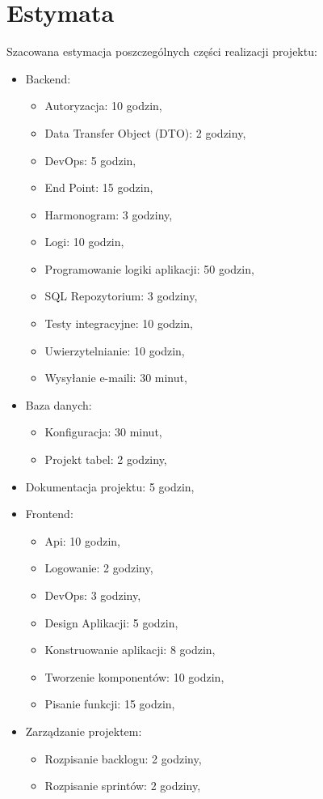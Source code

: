\documentclass[12pt,a4paper]{article}
\begin{document}
	\section{Estymata}
		\indent Szacowana estymacja poszczególnych części realizacji projektu:
		\begin{itemize}
			\item Backend:
				\begin{itemize}
					\item Autoryzacja: 10 godzin,
					\item Data Transfer Object (DTO): 2 godziny,
					\item DevOps: 5 godzin,
					\item End Point: 15 godzin,
					\item Harmonogram: 3 godziny,
					\item Logi: 10 godzin,
					\item Programowanie logiki aplikacji: 50 godzin,
					\item SQL Repozytorium: 3 godziny,
					\item Testy integracyjne: 10 godzin,
					\item Uwierzytelnianie: 10 godzin, 
					\item Wysyłanie e-maili: 30 minut,
				\end{itemize}
			\item Baza danych:
				\begin{itemize}
					\item Konfiguracja: 30 minut,
					\item Projekt tabel: 2 godziny,
				\end{itemize}
			\item Dokumentacja projektu: 5 godzin,
			\item Frontend: 
				\begin{itemize}
					\item Api: 10 godzin,
					\item Logowanie: 2 godziny,
					\item DevOps: 3 godziny,
					\item Design Aplikacji: 5 godzin,
					\item Konstruowanie aplikacji: 8 godzin,
					\item Tworzenie komponentów: 10 godzin,
					\item Pisanie funkcji: 15 godzin,
				\end{itemize}
			\item Zarządzanie projektem:
				\begin{itemize}
					\item Rozpisanie backlogu: 2 godziny,
					\item Rozpisanie sprintów: 2 godziny,
				\end{itemize}
		\end{itemize}				
\end{document}
